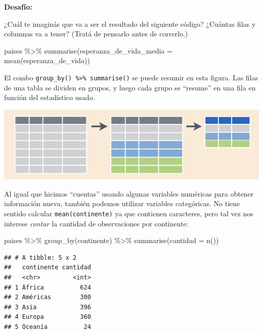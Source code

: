 \documentclass[
  openany]{book}
\newenvironment{Shaded}{\begin{snugshade}}{\end{snugshade}}
\newcommand{\AttributeTok}[1]{\textcolor[rgb]{0.77,0.63,0.00}{#1}}
\newcommand{\FunctionTok}[1]{\textcolor[rgb]{0.00,0.00,0.00}{#1}}
\newcommand{\NormalTok}[1]{#1}
\newcommand{\SpecialCharTok}[1]{\textcolor[rgb]{0.00,0.00,0.00}{#1}}
\begin{document}
\textbf{Desafío:}

¿Cuál te imaginás que va a ser el resultado del siguiente código?
¿Cuántas filas y columnas va a tener?
(Tratá de pensarlo antes de correrlo.)

\begin{Shaded}
\begin{Highlighting}[]
\NormalTok{paises }\SpecialCharTok{\%\textgreater{}\%} 
  \FunctionTok{summarise}\NormalTok{(}\AttributeTok{esperanza\_de\_vida\_media =} \FunctionTok{mean}\NormalTok{(esperanza\_de\_vida))}
\end{Highlighting}
\end{Shaded}

El combo \texttt{group\_by()\ \%\textgreater{}\%\ summarise()} se puede resumir en esta figura.
Las filas de una tabla se dividen en grupos, y luego cada grupo se ``resume'' en una fila en función del estadístico usado.

\includegraphics{img/group_by-summarize.png}

Al igual que hicimos ``cuentas'' usando algunas variables numéricas para obtener información nueva, también podemos utilizar variables categóricas.
No tiene sentido calcular \texttt{mean(continente)} ya que contienen caracteres, pero tal vez nos interese \emph{contar} la cantidad de observaciones por continente:

\begin{Shaded}
\begin{Highlighting}[]
\NormalTok{paises }\SpecialCharTok{\%\textgreater{}\%} 
  \FunctionTok{group\_by}\NormalTok{(continente) }\SpecialCharTok{\%\textgreater{}\%} 
  \FunctionTok{summarise}\NormalTok{(}\AttributeTok{cantidad =} \FunctionTok{n}\NormalTok{())}
\end{Highlighting}
\end{Shaded}

\begin{verbatim}
## # A tibble: 5 x 2
##   continente cantidad
##   <chr>         <int>
## 1 África          624
## 2 Américas        300
## 3 Asia            396
## 4 Europa          360
## 5 Oceanía          24
\end{verbatim}
\end{document}
